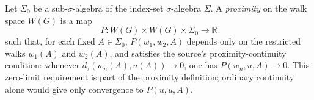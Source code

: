 
Let $\Sigma_0$ be a sub-$\sigma$-algebra of the index-set $\sigma$-algebra $\Sigma$. A \emph{proximity} on the walk space $W(G)$ is a map
\[
P:W(G)\times W(G)\times\Sigma_0\to\mathbb R
\]
such that, for each fixed $A\in\Sigma_0$, $P(w_1,w_2,A)$ depends only on the restricted walks $w_1(A)$ and $w_2(A)$, and satisfies the source's proximity-continuity condition: whenever $d_\tau(w_n(A),u(A))\to0$, one has $P(w_n,u,A)\to0$. This zero-limit requirement is part of the proximity definition; ordinary continuity alone would give only convergence to $P(u,u,A)$.
